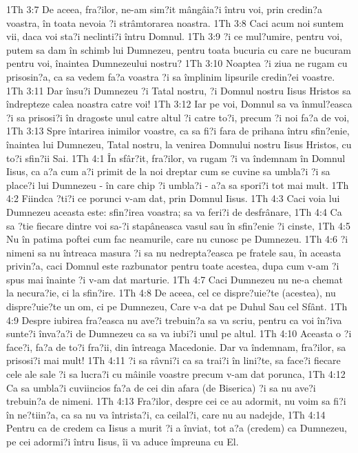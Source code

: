 1Th 3:7  De aceea, fra?ilor, ne-am sim?it mângâia?i întru voi, prin credin?a voastra, în toata nevoia ?i strâmtorarea noastra.
1Th 3:8  Caci acum noi suntem vii, daca voi sta?i neclinti?i întru Domnul.
1Th 3:9  ?i ce mul?umire, pentru voi, putem sa dam în schimb lui Dumnezeu, pentru toata bucuria cu care ne bucuram pentru voi, înaintea Dumnezeului nostru?
1Th 3:10  Noaptea ?i ziua ne rugam cu prisosin?a, ca sa vedem fa?a voastra ?i sa împlinim lipsurile credin?ei voastre.
1Th 3:11  Dar însu?i Dumnezeu ?i Tatal nostru, ?i Domnul nostru Iisus Hristos sa îndrepteze calea noastra catre voi!
1Th 3:12  Iar pe voi, Domnul sa va înmul?easca ?i sa prisosi?i în dragoste unul catre altul ?i catre to?i, precum ?i noi fa?a de voi,
1Th 3:13  Spre întarirea inimilor voastre, ca sa fi?i fara de prihana întru sfin?enie, înaintea lui Dumnezeu, Tatal nostru, la venirea Domnului nostru Iisus Hristos, cu to?i sfin?ii Sai.
1Th 4:1  În sfâr?it, fra?ilor, va rugam ?i va îndemnam în Domnul Iisus, ca a?a cum a?i primit de la noi dreptar cum se cuvine sa umbla?i ?i sa place?i lui Dumnezeu - în care chip ?i umbla?i - a?a sa spori?i tot mai mult.
1Th 4:2  Fiindca ?ti?i ce porunci v-am dat, prin Domnul Iisus.
1Th 4:3  Caci voia lui Dumnezeu aceasta este: sfin?irea voastra; sa va feri?i de desfrânare,
1Th 4:4  Ca sa ?tie fiecare dintre voi sa-?i stapâneasca vasul sau în sfin?enie ?i cinste,
1Th 4:5  Nu în patima poftei cum fac neamurile, care nu cunosc pe Dumnezeu.
1Th 4:6  ?i nimeni sa nu întreaca masura ?i sa nu nedrepta?easca pe fratele sau, în aceasta privin?a, caci Domnul este razbunator pentru toate acestea, dupa cum v-am ?i spus mai înainte ?i v-am dat marturie.
1Th 4:7  Caci Dumnezeu nu ne-a chemat la necura?ie, ci la sfin?ire.
1Th 4:8  De aceea, cel ce dispre?uie?te (acestea), nu dispre?uie?te un om, ci pe Dumnezeu, Care v-a dat pe Duhul Sau cel Sfânt.
1Th 4:9  Despre iubirea fra?easca nu ave?i trebuin?a sa va scriu, pentru ca voi în?iva sunte?i înva?a?i de Dumnezeu ca sa va iubi?i unul pe altul.
1Th 4:10  Aceasta o ?i face?i, fa?a de to?i fra?ii, din întreaga Macedonie. Dar va îndemnam, fra?ilor, sa prisosi?i mai mult!
1Th 4:11  ?i sa râvni?i ca sa trai?i în lini?te, sa face?i fiecare cele ale sale ?i sa lucra?i cu mâinile voastre precum v-am dat porunca,
1Th 4:12  Ca sa umbla?i cuviincios fa?a de cei din afara (de Biserica) ?i sa nu ave?i trebuin?a de nimeni.
1Th 4:13  Fra?ilor, despre cei ce au adormit, nu voim sa fi?i în ne?tiin?a, ca sa nu va întrista?i, ca ceilal?i, care nu au nadejde,
1Th 4:14  Pentru ca de credem ca Iisus a murit ?i a înviat, tot a?a (credem) ca Dumnezeu, pe cei adormi?i întru Iisus, îi va aduce împreuna cu El.
